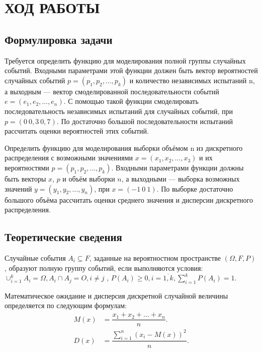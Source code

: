\section{ХОД РАБОТЫ}

\subsection{Формулировка задачи}

Требуется определить функцию для моделирования полной группы случайных событий.
Входными параметрами этой функции должен быть вектор вероятностей случайных
событий $ p = (p_1, p_2, \dots, p_k) $ и количество независимых испытаний n,
а выходным --- вектор смоделированной последовательности
событий $ e = (e_1, e_2, \dots, e_n) $. С помощью такой функции смоделировать
последовательность независимых испытаний для случайных событий,
при $ p = (0~0{,}3~0{,}7) $. По достаточно большой последовательности
испытаний рассчитать оценки вероятностей этих событий.

Определить функцию для моделирования выборки объёмом n из дискретного
распределения с возможными значениями $ x = (x_1, x_2, \dots, x_3) $ и
их вероятностями $ p = (p_1, p_2, \dots, p_k) $. Входными параметрами функции
должны быть векторы $ x $, $ p $ и объём выборки $ n $, а выходными --- выборка
возможных значений $ y = (y_1, y_2, \dots, y_n) $, при $ x = (-1~0~1) $.
По выборке достаточно большого объёма рассчитать оценки среднего значения и
дисперсии дискретного распределения.


\subsection{Теоретические сведения}

Случайные события $ A_i \subseteq F $, заданные на вероятностном пространстве $ (\Omega, F, P) $, образуют полную группу событий, если выполняются условия:
$ \cup_{i = 1}^{k} A_i = \Omega, A_i \cap A_j = O, i \neq j$ ,
$ P(A_i) \ge 0, i = \overline{1,k}, \sum\limits_{i = 1}^{k} P(A_i) = 1 $.

Математическое ожидание и дисперсия дискретной случайной величины определяется
по следующим формулам:
\begin{align*}
  M(x) &= \dfrac{x_1 + x_2 + \dots + x_n}{n}. \\
  D(x) &= \dfrac{\sum\limits_{i = 1}^{n} (x_i - M(x))^2}{n}.
\end{align*}

\pagebreak


